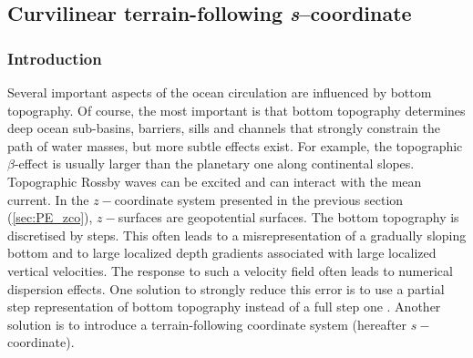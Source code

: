 \documentclass[../main/NEMO_manual]{subfiles}
\begin{document}
\newpage

\subsection{Curvilinear terrain-following \textit{s}--coordinate}
\label{subsec:PE_sco}

\subsubsection{Introduction}

Several important aspects of the ocean circulation are influenced by bottom topography.
Of course, the most important is that bottom topography determines deep ocean sub-basins, barriers, sills and
channels that strongly constrain the path of water masses, but more subtle effects exist.
For example, the topographic $\beta$-effect is usually larger than the planetary one along continental slopes.
Topographic Rossby waves can be excited and can interact with the mean current.
In the $z-$coordinate system presented in the previous section (\autoref{sec:PE_zco}),
$z-$surfaces are geopotential surfaces.
The bottom topography is discretised by steps.
This often leads to a misrepresentation of a gradually sloping bottom and to
large localized depth gradients associated with large localized vertical velocities.
The response to such a velocity field often leads to numerical dispersion effects.
One solution to strongly reduce this error is to use a partial step representation of bottom topography instead of
a full step one \cite{Pacanowski_Gnanadesikan_MWR98}.
Another solution is to introduce a terrain-following coordinate system (hereafter $s-$coordinate).
\end{document}
